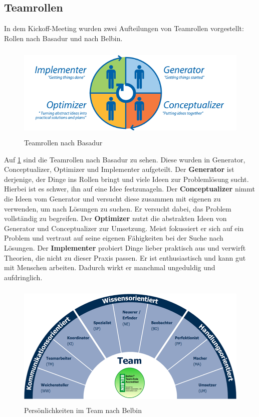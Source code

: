 \documentclass[a4paper,12pt,headsepline]{scrartcl}
\begin{document}
	\subsection{Teamrollen}
		In dem Kickoff-Meeting wurden zwei Aufteilungen von Teamrollen vorgestellt: Rollen nach Basadur und nach Belbin.
		\begin{figure} [H]
			\centering
			\includegraphics[height=4.5cm]{Images/Basadur.png}
			\caption{Teamrollen nach Basadur}
			\label{fig:Basadur}
		\end{figure}
		Auf \cref{fig:Basadur} sind die Teamrollen nach Basadur zu sehen. Diese wurden in Generator, Conceptualizer, Optimizer und Implementer aufgeteilt. Der \textbf{Generator} ist derjenige, der Dinge ins Rollen bringt und viele Ideen zur Problemlösung sucht. Hierbei ist es schwer, ihn auf eine Idee festzunageln. Der \textbf{Conceptualizer} nimmt die Ideen vom Generator und versucht diese zusammen mit eigenen zu verwenden, um nach Lösungen zu suchen. Er versucht dabei, das Problem vollständig zu begreifen. Der \textbf{Optimizer} nutzt die abstrakten Ideen von Generator und Conceptualizer zur Umsetzung. Meist fokussiert er sich auf ein Problem und vertraut auf seine eigenen Fähigkeiten bei der Suche nach Lösungen. Der \textbf{Implementer} probiert Dinge lieber praktisch aus und verwirft Theorien, die nicht zu dieser Praxis passen. Er ist enthusiastisch und kann gut mit Menschen arbeiten. Dadurch wirkt er manchmal ungeduldig und aufdringlich.\
		\begin{figure} [H]
			\centering
			\includegraphics[height=6cm, width=12cm]{Images/Belbin.png}
			\caption{Persönlichkeiten im Team nach Belbin}
			\label{fig:Belbin}
		\end{figure}
\end{document}
